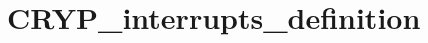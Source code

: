 \hypertarget{group___c_r_y_p__interrupts__definition}{\section{C\-R\-Y\-P\-\_\-interrupts\-\_\-definition}
\label{group___c_r_y_p__interrupts__definition}
}
